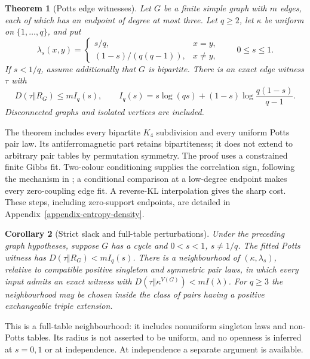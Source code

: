 \documentclass[a4paper,11pt,reqno]{amsart}
\theoremstyle{plain}
\newtheorem{theorem}{Theorem}[section]
\newtheorem{corollary}[theorem]{Corollary}
\theoremstyle{definition}
\theoremstyle{remark}
\begin{document}
\begin{theorem}[Potts edge witnesses]\label{theorem-potts-edge-entropy}
Let $G$ be a finite simple graph with $m$ edges, each of which has an
endpoint of degree at most three.  Let $q\ge2$, let $\kappa$ be uniform
on $\{1,\ldots,q\}$, and put
\[
 \lambda_s(x,y)=
 \begin{cases}s/q,&x=y,\\(1-s)/(q(q-1)),&x\ne y,\end{cases}
 \qquad 0\le s\le1.
\]
If $s<1/q$, assume additionally that $G$ is bipartite.  There is an
exact edge witness $\tau$ with
\[
 D(\tau\Vert R_G)\le m I_q(s),\qquad
 I_q(s)=s\log(qs)+(1-s)\log\frac{q(1-s)}{q-1}.
\]
Disconnected graphs and isolated vertices are included.
\end{theorem}

The theorem includes every bipartite $K_4$ subdivision and every uniform
Potts pair law.  Its antiferromagnetic part retains bipartiteness; it does
not extend to arbitrary pair tables by permutation symmetry.  The proof
uses a constrained finite Gibbs fit.  Two-colour conditioning supplies the
correlation sign, following the mechanism in \citet{csikvarilin2017}; a
conditional comparison at a low-degree endpoint makes every zero-coupling
edge fit.  A reverse-KL interpolation gives the sharp cost.  These steps,
including zero-support endpoints, are detailed in
Appendix~\ref{appendix-entropy-density}.

\begin{corollary}[Strict slack and full-table perturbations]
\label{corollary-potts-table-openness}
Under the preceding graph hypotheses, suppose $G$ has a cycle and
$0<s<1$, $s\ne1/q$.  The fitted Potts witness has
$D(\tau\Vert R_G)<mI_q(s)$.  There is a neighbourhood of
$(\kappa,\lambda_s)$, relative to compatible positive singleton and
symmetric pair laws, in which every input admits an exact witness with
$D(\tau\Vert\kappa^{V(G)})<mI(\lambda)$.
For $q\ge3$ the neighbourhood may be chosen inside the class of pairs
having a positive exchangeable triple extension.
\end{corollary}

This is a full-table neighbourhood: it includes nonuniform singleton laws
and non-Potts tables.  Its radius is not asserted to be uniform, and no
openness is inferred at $s=0,1$ or at independence.  At independence a
separate argument is available.
\end{document}
